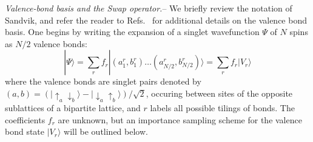 \documentclass[prl,aps,twocolumn,floatfix,amsmath,amssymb,superscriptaddress,tightenlines]{revtex4}
\begin{document}
{\it Valence-bond basis and the Swap operator.}-- We briefly review the notation of Sandvik, and refer the reader to 
Refs.~\cite{Sandvik,Beach,AWSloop} for additional details on the valence bond basis.
One begins by writing the expansion of a singlet
wavefunction $\Psi$ of $N$ spins as $N/2$ valence bonds:
\begin{equation}
| \Psi \rangle = \sum_r f_r|(a^r_1,b^r_1) \ldots (a^r_{N/2},b^r_{N/2}) \rangle = \sum_r f_r| V_r \rangle
\end{equation}
where the valence bonds are singlet pairs denoted by $(a,b) = (\lvert\uparrow_a \downarrow_b \rangle - \lvert\downarrow_a \uparrow_b\rangle)/\sqrt{2}$,
occuring between sites of the opposite sublattices of a bipartite lattice, and $r$ labels all possible tilings of bonds.  The coefficients $f_r$ are unknown, but an importance sampling scheme \cite{Sandvik} for the valence bond state $| V_r \rangle$ will be outlined below.  
\end{document}
